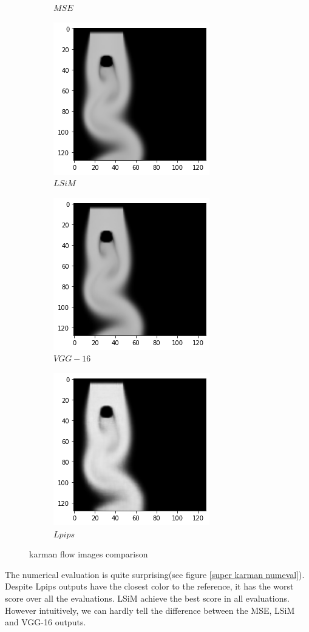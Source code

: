 \documentclass[a4paper,12pt,twoside]{report}
\begin{document}
\begin{figure}
\begin{subfigure}{0.32\textwidth}
		\caption{$MSE$}
	\end{subfigure}
	\begin{subfigure}{0.32\textwidth}
		\centering
		\includegraphics[scale=0.5]{superresolution/karman_lsim.png}
		\caption{$LSiM$}
	\end{subfigure}
	\begin{subfigure}{0.32\textwidth}
		\centering
		\includegraphics[scale=0.5]{superresolution/karman_vgg.png}
		\caption{$VGG-16$}
	\end{subfigure}
	\begin{subfigure}{0.32\textwidth}
		\centering
		\includegraphics[scale=0.5]{superresolution/karman_lpips.png}
		\caption{$Lpips$}
	\end{subfigure}
	\caption{karman flow images comparison}
	\label{super karman}
\end{figure}
The numerical evaluation is quite surprising(see figure \ref{super karman numeval}). Despite Lpips outputs have the closest color to the reference, it has the worst score over all the evaluations. LSiM achieve the best score in all evaluations. However intuitively, we can hardly tell the difference between the MSE, LSiM and VGG-16 outputs.
 
\end{document}

